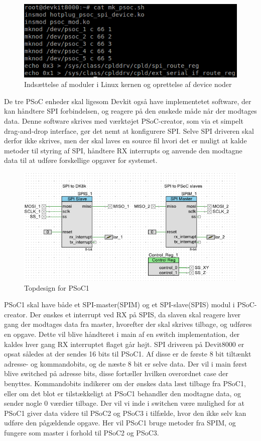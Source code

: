 \begin{figure}[H]
\includegraphics[scale=0.9]{Screenshots/Devkit_cat_mk_psoc}
\caption{Indsættelse af moduler i Linux kernen og oprettelse af device noder}
\end{figure}

De tre PSoC enheder skal ligesom Devkit også have implementetet software, der kan håndtere SPI forbindelsen, og reagere
på den ønskede måde når der modtages data. Denne software skrives med værktøjet PSoC-creator, som via et simpelt drag-and-drop interface, gør det
nemt at konfigurere SPI. Selve SPI driveren skal derfor ikke skrives, men der skal laves en source fil hvori det er muligt at kalde metoder til
styring af SPI, håndtere RX interrupts og anvende den modtagne data til at udføre forskellige opgaver for systemet.

\begin{figure}[H]
\includegraphics[scale=0.8]{Screenshots/PSOC_opstilling_spi}
\caption{Topdesign for PSoC1}
\end{figure}

PSoC1 skal have både et SPI-master(SPIM) og et SPI-slave(SPIS) modul i PSoC-creator. Der ønskes et interrupt ved RX på SPIS, da slaven skal reagere
hver gang der modtages data fra master, hvorefter der skal skrives tilbage, og udføres en opgave. Dette vil blive håndteret i main af en switch 
implementation, der kaldes hver gang RX interruptet flaget går højt. SPI driveren på Devit8000 er opsat således at der sendes 16 bits til PSoC1.
Af disse er de første 8 bit tiltænkt adresse- og kommandobits, og de næste 8 bit er selve data. Der vil i main først blive switched på adresse bits,
disse fortæller hvilken overordnet case der benyttes. Kommandobits indikerer om der ønskes data læst tilbage fra PSoC1, eller om det blot er 
tilstækkeligt at PSoC1 behandler den modtagne data, og sender nogle 0 værdier tilbage. Der vil vi inde i switchen være mulighed for at PSoC1 giver 
data videre til PSoC2 og PSoC3 i tilfælde, hvor den ikke selv kan udføre den pågældende opgave. Her vil PSoC1 bruge metoder fra SPIM, og fungere som master 
i forhold til PSoC2 og PSoC3. 

